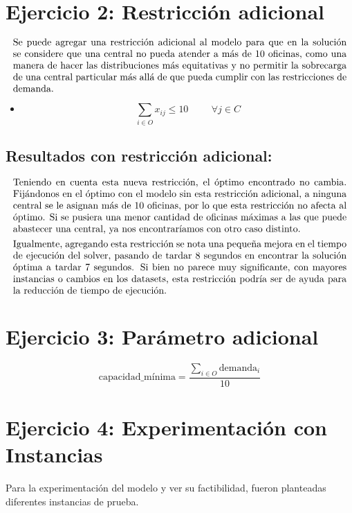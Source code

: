 \documentclass{article}
\begin{document}
\section*{Ejercicio 2: Restricción adicional}
\[
\parbox{\textwidth}{Se puede agregar una restricción adicional al modelo para que en la solución se considere que una central no pueda atender a más de 10 oficinas, como una manera de hacer las distribuciones más equitativas y no permitir la sobrecarga de una central particular más allá de que pueda cumplir con las restricciones de demanda.}
\]


\begin{itemize}
    \item {}
    \[
   \sum_{i \in O} x_{ij} \leq 10 \hspace{1cm}\forall j \in C
    \]
\end{itemize}
\subsection*{Resultados con restricción adicional:}
\[
\parbox{\textwidth}{Teniendo en cuenta esta nueva restricción, el óptimo encontrado no cambia. Fijándonos en el óptimo con el modelo sin esta restricción adicional, a ninguna central se le asignan más de 10 oficinas, por lo que esta restricción no afecta al óptimo. Si se pusiera una menor cantidad de oficinas máximas a las que puede abastecer una central, ya nos encontraríamos con otro caso distinto.}
\]
\[
\parbox{\textwidth}{Igualmente, agregando esta restricción se nota una pequeña mejora en el tiempo de ejecución del solver, pasando de tardar 8 segundos en encontrar la solución óptima a tardar 7 segundos. Si bien no parece muy significante, con mayores instancias o cambios en los datasets, esta restricción podría ser de ayuda para la reducción de tiempo de ejecución.}
\]

\section*{Ejercicio 3: Parámetro adicional}

\[
\text{capacidad\_mínima} = \frac{\sum_{i \in O} \text{demanda}_i}{10}
\]


\section*{Ejercicio 4: Experimentación con Instancias}
Para la experimentación del modelo y ver su factibilidad, fueron planteadas diferentes instancias de prueba. 
\end{document}
